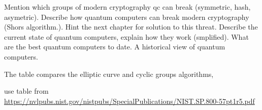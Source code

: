 Mention which groups of modern cryptography qc can break (symmetric, hash, asymetric). Describe how quantum computers can break modern cryptography (Shors algorithm.). Hint the next chapter for solution to this threat. Describe the current state of quantum computers, explain how they work (smplified). What are the best quantum computers to date. A historical view of quantum computers. 

The table compares the elliptic curve and cyclic groups algorithms, 

use table from \url{https://nvlpubs.nist.gov/nistpubs/SpecialPublications/NIST.SP.800-57pt1r5.pdf}